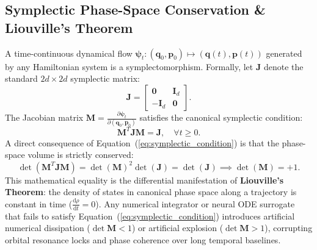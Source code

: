 \documentclass[preprint,12pt,3p]{elsarticle}
\begin{document}
\subsection{Symplectic Phase-Space Conservation \& Liouville's Theorem}
A time-continuous dynamical flow $\bm{\psi}_t: (\bm{q}_0, \bm{p}_0) \mapsto (\bm{q}(t), \bm{p}(t))$ generated by any Hamiltonian system is a symplectomorphism. Formally, let $\bm{J}$ denote the standard $2d \times 2d$ symplectic matrix:
\begin{equation}
\bm{J} = \begin{bmatrix} \bm{0} & \bm{I}_d \\ -\bm{I}_d & \bm{0} \end{bmatrix}.
\label{eq:symplectic_matrix}
\end{equation}
The Jacobian matrix $\bm{M} = \frac{\partial \bm{\psi}_t}{\partial (\bm{q}_0, \bm{p}_0)}$ satisfies the canonical symplectic condition:
\begin{equation}
\bm{M}^T \bm{J} \bm{M} = \bm{J}, \quad \forall t \ge 0.
\label{eq:symplectic_condition}
\end{equation}
A direct consequence of Equation~(\ref{eq:symplectic_condition}) is that the phase-space volume is strictly conserved:
\begin{equation}
\det(\bm{M}^T \bm{J} \bm{M}) = \det(\bm{M})^2 \det(\bm{J}) = \det(\bm{J}) \implies \det(\bm{M}) = +1.
\label{eq:liouville_volume}
\end{equation}
This mathematical equality is the differential manifestation of \textbf{Liouville's Theorem}: the density of states in canonical phase space along a trajectory is constant in time ($\frac{\mathrm{d}\rho}{\mathrm{d}t} = 0$). Any numerical integrator or neural ODE surrogate that fails to satisfy Equation~(\ref{eq:symplectic_condition}) introduces artificial numerical dissipation ($\det \bm{M} < 1$) or artificial explosion ($\det \bm{M} > 1$), corrupting orbital resonance locks and phase coherence over long temporal baselines.
\end{document}
